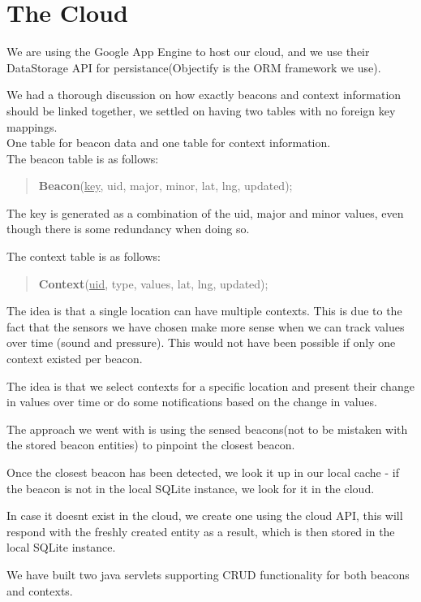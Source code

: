 \section{The Cloud}
We are using the Google App Engine to host our cloud, and we use their DataStorage API for persistance(Objectify is the ORM framework we use).

We had a thorough discussion on how exactly beacons and context information should be linked together, we settled on having two tables with no foreign key mappings.\\
One table for beacon data and one table for context information.\\

The beacon table is as follows:
\begin{quotation}
\textbf{Beacon}(\underline{key}, uid, major, minor, lat, lng, updated);
\end{quotation}
The key is generated as a combination of the uid, major and minor values, even though there is some redundancy when doing so.

The context table is as follows:
\begin{quotation}
\textbf{Context}(\underline{uid}, type, values, lat, lng, updated);
\end{quotation}
The idea is that a single location can have multiple contexts. This is due to the fact that the sensors we have chosen make more sense when we can track values over time (sound and pressure).
This would not have been possible if only one context existed per beacon.

The idea is that we select contexts for a specific location and present their change in values over time or do some notifications based on the change in values.

The approach we went with is using the sensed beacons(not to be mistaken with the stored beacon entities) to pinpoint the closest beacon.

Once the closest beacon has been detected, we look it up in our local cache - if the beacon is not in the local SQLite instance, we look for it in the cloud.

In case it doesnt exist in the cloud, we create one using the cloud API, this will respond with the freshly created entity as a result, which is then stored in the local SQLite instance.

We have built two java servlets supporting CRUD functionality for both beacons and contexts.
